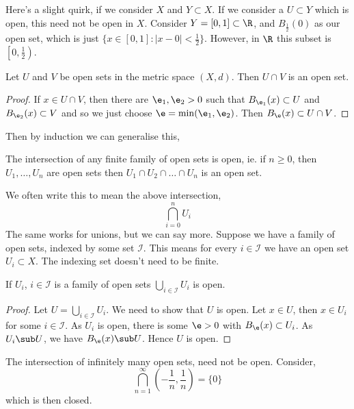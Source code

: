 \noindent
Here's a slight quirk, if we consider $X$ and $Y \subset X$. If we consider a $U \subset Y$ which is open, this need not be open in $X$. Consider $Y = [0, 1] \subset \R$, and $B_{\frac{1}{2}}(0)$ as our open set, which is just $\{x \in [0, 1] : |x - 0| < \frac{1}{2}\}$. However, in $\R$ this subset is $\left[ 0, \frac{1}{2} \right)$.

\begin{nprop}
   Let $U$ and $V$ be open sets in the metric space $(X, d)$. Then $U \cap V$ is an open set.
\end{nprop}
\begin{proof}
  If $x \in U \cap V$, then there are $\e_1, \e_2 > 0$ such that $B_{\e_1}(x) \subset U$ and $B_{\e_2}(x) \subset V$ and so we just choose $\e = \min(\e_1, \e_2)$. Then $B_\e(x) \subset U \cap V$.
\end{proof}

\noindent
Then by induction we can generalise this,
\begin{nprop}
  The intersection of any finite family of open sets is open, ie. if $n \ge 0$, then $U_1, \dots, U_n$ are open sets then $U_1 \cap U_2 \cap \dots \cap U_n$ is an open set.
\end{nprop}

\noindent
We often write this to mean the above intersection,
$$ \bigcap_{i=0}^n U_i$$
The same works for unions, but we can say more. Suppose we have a family of open sets, indexed by some set $\mathcal{I}$. This means for every $i \in \mathcal{I}$ we have an open set $U_i \subset X$. The indexing set doesn't need to be finite.

\begin{nprop}
   If $U_i$, $i \in \mathcal{I}$ is a family of open sets $\bigcup_{i\in\mathcal{I}} U_i$ is open.
\end{nprop}
\begin{proof}
  Let $U = \bigcup_{i \in \mathcal{I}} U_i$. We need to show that $U$ is open. Let $x \in U$, then $x \in U_i$ for some $i \in \mathcal{I}$. As $U_i$ is open, there is some $\e > 0$ with $B_\e(x) \subset U_i$. As $U_i \sub U$, we have $B_\e(x) \sub U$. Hence $U$ is open.
\end{proof}

\noindent
The intersection of infinitely many open sets, need not be open. Consider,
$$ \bigcap_{n = 1}^\infty \left( -\frac{1}{n}, \frac{1}{n} \right) = \{0\}$$
which is then closed.

